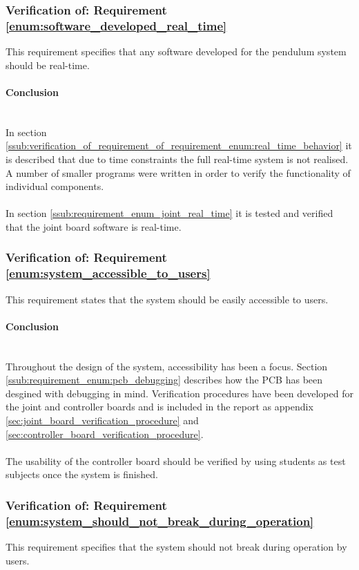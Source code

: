\subsubsection{Verification of: Requirement \ref{enum:software_developed_real_time}} %
\label{sub:verification_of_requirement_enum:software_developed_real_time}
This requirement specifies that any software developed for the pendulum system should be real-time.

\paragraph{Conclusion}~\\
In section \ref{ssub:verification_of_requirement_of_requirement_enum:real_time_behavior} it is described that due to time constraints the full real-time system is not realised.
A number of smaller programs were written in order to verify the functionality of individual components.
\\~\\
In section \ref{ssub:requirement_enum_joint_real_time} it is tested and verified that the joint board software is real-time.


\subsubsection{Verification of: Requirement \ref{enum:system_accessible_to_users}} %
\label{sub:verification_of_requirement_enum:system_accessible_to_users}
This requirement states that the system should be easily accessible to users.

\paragraph{Conclusion}~\\
Throughout the design of the system, accessibility has been a focus.
Section \ref{ssub:requirement_enum:pcb_debugging} describes how the PCB has been desgined with debugging in mind.
Verification procedures have been developed for the joint and controller boards and is included in the report as appendix \ref{sec:joint_board_verification_procedure} and \ref{sec:controller_board_verification_procedure}.
\\~\\
The usability of the controller board should be verified by using students as test subjects once the system is finished. 

\subsubsection{Verification of: Requirement \ref{enum:system_should_not_break_during_operation}} %
\label{sub:verification_of_requirement_enum:system_should_not_break_during_operation}
This requirement specifies that the system should not break during operation by users.

